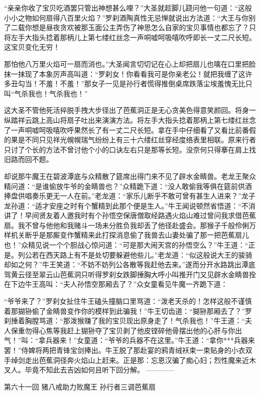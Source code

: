 \documentclass[12pt,UTF8]{ctexbook}
\begin{document}
“亲亲你收了宝贝吃酒罢只管出神想甚么哩？”大圣就趁脚儿跷问他一句道：“这般小小之物如何扇得八百里火焰？”罗刹酒陶真性无忌惮就说出方法道：“大王与你别了二载你想是昼夜贪欢被那玉面公主弄伤了神思怎么自家的宝贝事情也都忘了？只将左手大指头捻着那柄儿上第七缕红丝念一声哃嘘呵吸嘻吹呼即长一丈二尺长短。这宝贝变化无穷！

那怕他八万里火焰可一扇而消也。”大圣闻言切切记在心上却把扇儿也噙在口里把脸抹一抹现了本象厉声高叫道：“罗刹女！你看看我可是你亲老公！就把我缠了这许多丑勾当！不羞！不羞！”那女子一见是孙行者慌得推倒桌席跌落尘埃羞愧无比只叫“气杀我也！气杀我也！”

这大圣不管他死活捽脱手拽大步径出了芭蕉洞正是无心贪美色得意笑颜回。将身一纵踏祥云跳上高山将扇子吐出来演演方法。将左手大指头捻着那柄上第七缕红丝念了一声哃嘘呵吸嘻吹呼果然长了有一丈二尺长短。拿在手中仔细看了又看比前番假的果是不同只见祥光幌幌瑞气纷纷上有三十六缕红丝穿经度络表里相联。原来行者只讨了个长的方法不曾讨他个小的口诀左右只是那等长短。没奈何只得搴在肩上找旧路而回不题。

却说那牛魔王在碧波潭底与众精散了筵席出得门来不见了辟水金睛兽。老龙王聚众精问道：“是谁偷放牛爷的金睛兽也？”众精跪下道：“没人敢偷我等俱在筵前供酒捧盘供唱奏乐更无一人在前。”老龙道：“家乐儿断乎不敢可曾有甚生人进来？”龙子龙孙道：“适才安座之时有个蟹精到此那个便是生人。”牛王闻说顿然省悟道：“不消讲了！早间贤友着人邀我时有个孙悟空保唐僧取经路遇火焰山难过曾问我求借芭蕉扇。我不曾与他他和我赌斗一场未分胜负我却丢了他径赴盛会。那猴子千般伶俐万样机关断乎是那厮变作蟹精来此打探消息偷了我兽去山妻处骗了那一把芭蕉扇儿也！”众精见说一个个胆战心惊问道：“可是那大闹天宫的孙悟空么？”牛王道：“正是。列公若在西天路上有不是处切要躲避他些儿。”老龙道：“似这般说大王的骏骑却如之何？”牛王笑道：“不妨不妨列公各散等我赶他去来。”遂而分开水路跳出潭底驾黄云径至翠云山芭蕉洞只听得罗刹女跌脚捶胸大呼小叫推开门又见辟水金睛兽拴在下边牛王高叫：“夫人孙悟空那厢去了？”众女童看见牛魔一齐跪下道：

“爷爷来了？”罗刹女扯住牛王磕头撞脑口里骂道：“泼老天杀的！怎样这般不谨慎着那猢狲偷了金睛兽变作你的模样到此骗我！”牛王切齿道：“猢狲那厢去了？”罗刹捶着胸膛骂道：“那泼猴赚了我的宝贝现出原身走了！气杀我也！”牛王道：“夫人保重勿得心焦等我赶上猢狲夺了宝贝剥了他皮铿碎他骨摆出他的心肝与你出气！”叫：“拿兵器来！”女童道：“爷爷的兵器不在这里。”牛王道：“拿你***兵器来罢！”侍婢将两把青锋宝剑捧出。牛王脱了那赴宴的鸦青绒袄束一束贴身的小衣双手绰剑走出芭蕉洞径奔火焰山上赶来。正是那：忘恩汉骗了痴心妇；烈性魔来近木叉人。毕竟不知此去吉凶如何且听下回分解。
------------

第六十一回 猪八戒助力败魔王 孙行者三调芭蕉扇
\end{document}
